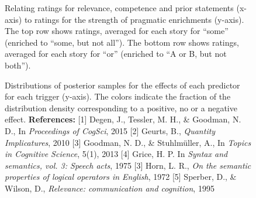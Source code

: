 \documentclass[11pt,letterpaper]{article}
\begin{document}


\begin{figure}
 \caption{Relating ratings for relevance, competence and prior statements (x-axis) to
ratings for the strength of pragmatic enrichments (y-axis). The top row shows ratings,
averaged for each story for ``some'' (enriched to ``some, but not all''). The bottom row shows ratings, averaged for each story for ``or'' (enriched to ``A or B, but not both'').}
    \label{by-item-ratings}
\end{figure}

\begin{figure}   
    \caption{Distributions of posterior samples for the effects of each predictor for each trigger (y-axis). The colors indicate the fraction of the distribution density corresponding to a positive, no or a negative effect. \newline \textbf{References:} [1] Degen, J., Tessler, M. H., \& Goodman, N. D., In \textit{Proceedings of CogSci}, 2015 [2] Geurts, B., \textit{Quantity Implicatures}, 2010 [3] Goodman, N. D., \& Stuhlm\"uller, A., In \textit{Topics in Cognitive Science}, 5(1), 2013 [4] Grice, H. P. In \textit{Syntax and semantics, vol. 3: Speech acts}, 1975 [3] Horn, L. R., \textit{On the semantic properties of logical operators in English}, 1972 [5] Sperber, D., \& Wilson, D., \textit{Relevance: communication and cognition}, 1995  
    }
    \label{posteriors}
\end{figure}
\end{document}
